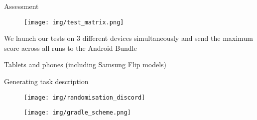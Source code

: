 \documentclass{beamer}%
\begin{document}
\begin{frame}{Assessment}
\begin{changemargin}
\footnotesize


\begin{figure}[h]
\begin{minipage}[h]{0.9\linewidth}
\hbox{\hspace{-2em}\texttt{[image: img/test\_matrix.png]}}
\end{minipage}
\end{figure}

We launch our tests on 3 different devices simultaneously and send the maximum score across all runs to the Android Bundle

Tablets and phones (including Samsung Flip models)

\end{changemargin}
\end{frame}
\begin{frame}{Generating task description}
\begin{changemargin}
\footnotesize

\begin{figure}[h]
\begin{minipage}[h]{0.9\linewidth}
\hbox{\hspace{-2em}\texttt{[image: img/randomisation\_discord]}}
\end{minipage}
\end{figure}



\end{changemargin}
\end{frame}
\begin{frame}{}
\begin{changemargin}
\footnotesize

\begin{figure}[h]
\begin{minipage}[h]{0.92\linewidth}
\hbox{\hspace{-2em}\texttt{[image: img/gradle\_scheme.png]}}
\end{minipage}
\end{figure}

\end{changemargin}
\end{frame}
\end{document}

